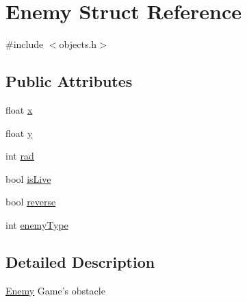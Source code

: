 \hypertarget{struct_enemy}{\section{Enemy Struct Reference}
\label{struct_enemy}
}


{\ttfamily \#include $<$objects.\-h$>$}

\subsection*{Public Attributes}
\begin{DoxyCompactItemize}
\item 
float \hyperlink{struct_enemy_a9b45f57b3d7474400108f09587df67b0}{x}
\item 
float \hyperlink{struct_enemy_aa7d03269f81e619c117ce49f40f53eef}{y}
\item 
int \hyperlink{struct_enemy_a6527a7e8701f98e3fb353dfbbc138bde}{rad}
\item 
bool \hyperlink{struct_enemy_af6cf896248bf6e7fc3468781a17e0a98}{is\-Live}
\item 
bool \hyperlink{struct_enemy_a6184ea9e648f99f55e2f3b80a26370eb}{reverse}
\item 
int \hyperlink{struct_enemy_ac63693289c1945d49cbf360aa604ab02}{enemy\-Type}
\end{DoxyCompactItemize}


\subsection{Detailed Description}
\hyperlink{struct_enemy}{Enemy} Game's obstacle 

